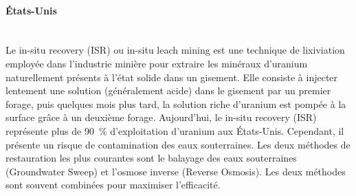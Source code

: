 \documentclass{article}
\begin{document}
\paragraph{États-Unis \\ \\}
Le in-situ recovery (ISR) ou in-situ leach mining est une technique de lixiviation employée dans l’industrie minière pour extraire les minéraux d’uranium naturellement présents à l'état solide dans un gisement. Elle consiste à injecter lentement une solution (généralement acide) dans le gisement par un premier forage, puis quelques mois plus tard, la solution riche d’uranium est pompée à la surface grâce à un deuxième forage. 
Aujourd’hui, le in-situ recovery (ISR) représente plus de 90~\% d’exploitation d’uranium aux États-Unis. Cependant, il présente un risque de contamination des eaux souterraines.
Les deux méthodes de restauration les plus courantes sont le balayage des eaux souterraines (Groundwater Sweep) et l'osmose inverse (Reverse Osmosis).
Les deux méthodes sont souvent combinées pour maximiser l’efficacité.%
\end{document}
